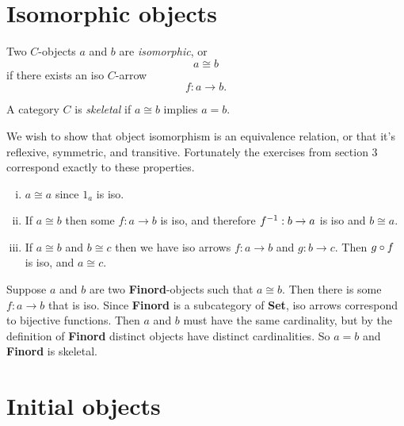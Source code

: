 \documentclass[12pt]{article}
\begin{document}
\section{Isomorphic objects}

    \begin{defi}
        Two $C$-objects $a$ and $b$ are \emph{isomorphic}, or 
        $$a \cong b$$ 
        if there exists an iso $C$-arrow
        $$f: a \to b.$$
    \end{defi}

    \begin{defi}
        A category $C$ is \emph{skeletal} if $a \cong b$ implies $a = b$.
    \end{defi}

    \begin{exercise}
        \item We wish to show that object isomorphism is an equivalence relation, or that it's reflexive, symmetric, and transitive. Fortunately the exercises from section 3 correspond exactly to these properties.
        \begin{enumerate}[(i)]
            \item $a \cong a$ since $1_a$ is iso.
            \item If $a \cong b$ then some $f : a \to b$ is iso, and therefore $f^{-1} : b \to a$ is iso and $b \cong a$.
            \item If $a \cong b$ and $b \cong c$ then we have iso arrows $f : a \to b$ and $g : b \to c$. Then $g \circ f$ is iso, and $a \cong c$.
        \end{enumerate}
    \end{exercise}

    \begin{exercise}
        \item Suppose $a$ and $b$ are two \textbf{Finord}-objects such that $a \cong b$. Then there is some $f : a \to b$ that is iso.
        Since \textbf{Finord} is a subcategory of \textbf{Set}, iso arrows correspond to bijective functions.
        Then $a$ and $b$ must have the same cardinality, but by the definition of \textbf{Finord} distinct objects have distinct cardinalities. So $a = b$ and \textbf{Finord} is skeletal.
    \end{exercise}

\section{Initial objects}
\end{document}
